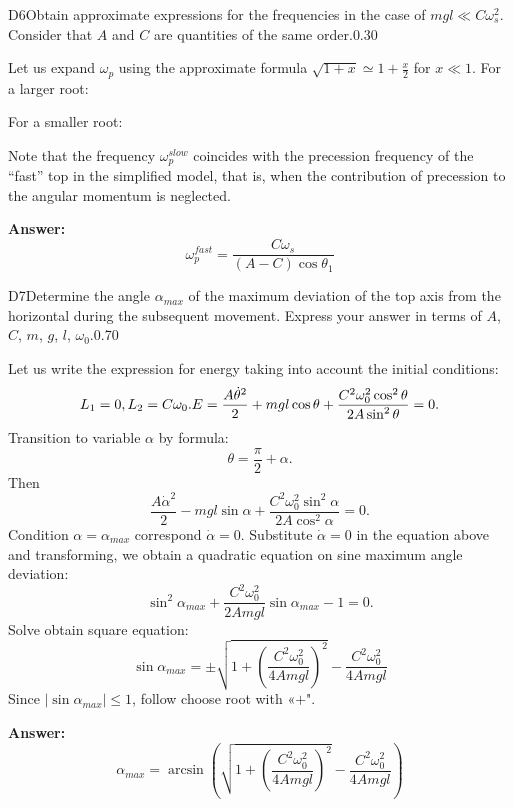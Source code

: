 \documentclass[11pt,a4paper]{article}
\begin{document}
\begin{solcard}{D6}{Obtain approximate expressions for the frequencies in the case of $mgl \ll C \omega_s^2$. Consider that $A$ and $C$ are quantities of the same order.}{0.30}

Let us expand $\omega_p$ using the approximate formula $\sqrt{1 + x} \simeq 1 + \frac{x}{2}$ for $x \ll 1$. For a larger root:


For a smaller root:


Note that the frequency $\omega_p^{slow}$ coincides with the precession frequency of the “fast” top in the simplified model, that is, when the contribution of precession to the angular momentum is neglected.

\par\smallskip\noindent\textbf{Answer:} $$ \omega_p^{fast} = \frac{C\omega_s}{(A-C)\cos\theta_1} $$
\end{solcard}

\begin{solcard}{D7}{Determine the angle $\alpha_{max}$ of the maximum deviation of the top axis from the horizontal during the subsequent movement. Express your answer in terms of $A$, $C$, $m$, $g$, $l$, $\omega_0$.}{0.70}

Let us write the expression for energy taking into account the initial conditions: $$ L_1 = 0, \\ L_2 = C\omega_0. \\ E =\frac{A\dot{\theta}^2}{2} + mgl\cos{\theta} + \frac{C^2 \omega_0^2 \cos^2{\theta}}{2A\sin^2{\theta}} = 0. $$ Transition to variable $\alpha$ by formula: $$ \theta = \frac{\pi }{2} + \alpha. $$ Then $$ \frac{A\dot{\alpha}^2}{2}  -mgl\sin{\alpha} + \frac{C^2 \omega_0^2 \sin^2{\alpha}}{2A\cos^2{\alpha}} = 0. $$Condition $\alpha = \alpha_{max}$ correspond $\dot{\alpha} = 0$. Substitute $\dot\alpha = 0$ in the equation above and transforming, we obtain a quadratic equation on sine maximum angle deviation: $$ \sin^2{\alpha_{max}} + \frac{C^2 \omega_0^2}{2Amgl}\sin{\alpha_{max}} - 1 = 0. $$ Solve obtain square equation: $$ \sin{\alpha_{max}} = \pm\sqrt{1+\left(\frac{C^2 \omega_0^2}{4Amgl}\right)^2}-\frac{C^2 \omega_0^2}{4Amgl} $$ Since $|\sin \alpha_{max}| \leq 1$, follow choose root with «$+$".

\par\smallskip\noindent\textbf{Answer:} $$ \alpha_{max} = \arcsin \left(\sqrt{1+\left(\frac{C^2 \omega_0^2}{4Amgl}\right)^2}-\frac{C^2 \omega_0^2}{4Amgl}\right) $$
\end{solcard}
\end{document}
